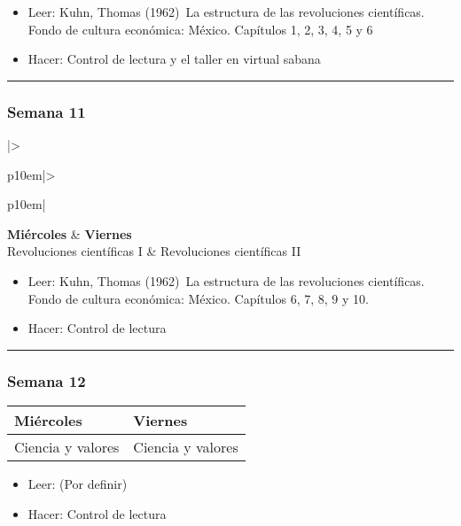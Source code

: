 \documentclass[spanish,]{article}
\begin{document}
\begin{itemize}
\item
  Leer: Kuhn, Thomas (1962)~La estructura de las revoluciones
  científicas. Fondo de cultura económica: México. Capítulos 1, 2, 3, 4, 5 y 6 
\item
  Hacer: Control de lectura y el taller en virtual sabana
\end{itemize}

\begin{center}\rule{0.5\linewidth}{\linethickness}\end{center}

\subsubsection{Semana 11}\label{semana-11}

\begin{tabular}{|>{\raggedright\arraybackslash}p{10em}|>{\raggedright\arraybackslash}p{10em}|}
\hline
\textbf{Miércoles} & \textbf{Viernes}\\
\hline
Revoluciones científicas I & Revoluciones científicas II\\
\hline
\end{tabular}

\begin{itemize}
\item
  Leer: Kuhn, Thomas (1962)~La estructura de las revoluciones
  científicas. Fondo de cultura económica: México. Capítulos 6, 7,
  8, 9 y 10.
\item
  Hacer: Control de lectura
\end{itemize}

\begin{center}\rule{0.5\linewidth}{\linethickness}\end{center}

\subsubsection{Semana 12}\label{semana-12}

\begin{tabular}{|>{\raggedright\arraybackslash}p{10em}|>{\raggedright\arraybackslash}p{10em}|}
\hline
\textbf{Miércoles} & \textbf{Viernes}\\
\hline
Ciencia y valores & Ciencia y valores\\
\hline
\end{tabular}

\begin{itemize}
\item
  Leer: (Por definir)
\item
  Hacer: Control de lectura
\end{itemize}
\end{document}
